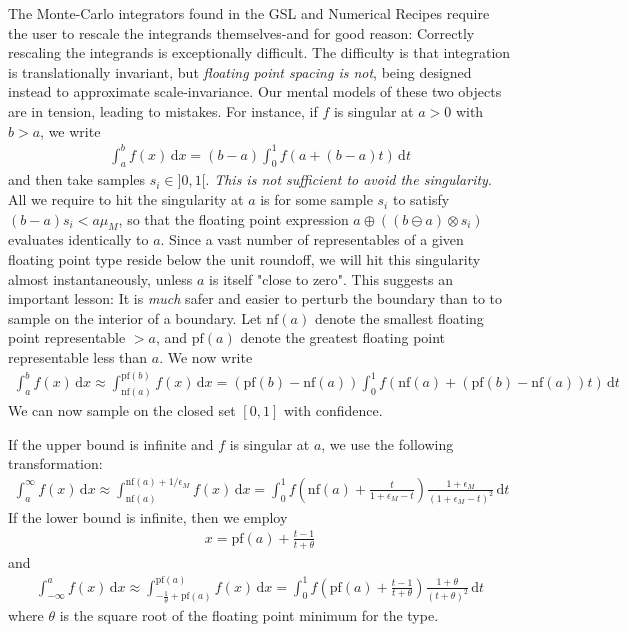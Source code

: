 \documentclass{ansarticle}
\begin{document}
The Monte-Carlo integrators found in the GSL and Numerical Recipes require the user to rescale the integrands themselves-and for good reason: Correctly rescaling the integrands is exceptionally difficult.
The difficulty is that integration is translationally invariant, but \emph{floating point spacing is not}, being designed instead to approximate scale-invariance.
Our mental models of these two objects are in tension, leading to mistakes.
For instance, if $f$ is singular at $a > 0$ with $b > a$, we write
\begin{align*}
\int_{a}^{b} f(x) \, \mathrm{d}x = (b-a) \int_{0}^{1} f(a + (b-a)t) \, \mathrm{d}t
\end{align*}
and then take samples $s_{i} \in ]0, 1[$.
\emph{This is not sufficient to avoid the singularity}.
All we require to hit the singularity at $a$ is for some sample $s_i$ to satisfy $(b-a)s_i < a\mu_{M}$, so that the floating point expression $a\oplus((b\ominus a)\otimes s_i)$ evaluates identically to $a$.
Since a vast number of representables of a given floating point type reside below the unit roundoff, we will hit this singularity almost instantaneously, unless $a$ is itself "close to zero".
This suggests an important lesson: It is \emph{much} safer and easier to perturb the boundary than to to sample on the interior of a boundary.
Let $\mathrm{nf}(a)$ denote the smallest floating point representable $> a$, and $\mathrm{pf}(a)$ denote the greatest floating point representable less than $a$.
We now write
\begin{align*}
\int_{a}^{b} f(x) \, \mathrm{d}x \approx \int_{\mathrm{nf}(a)}^{\mathrm{pf}(b)} f(x) \, \mathrm{d}x  = (\mathrm{pf}(b)- \mathrm{nf}(a)) \int_{0}^{1} f(\mathrm{nf}(a) + (\mathrm{pf}(b)-\mathrm{nf}(a))t) \, \mathrm{d}t
\end{align*}
We can now sample on the closed set $[0, 1]$ with confidence.

If the upper bound is infinite and $f$ is singular at $a$, we use the following transformation:
\begin{align*}
\int_{a}^{\infty} f(x) \, \mathrm{d}x \approx \int_{\mathrm{nf}(a)}^{\mathrm{nf}(a) + 1/\epsilon_{M}} f(x) \, \mathrm{d}x = \int_{0}^{1} f\left(\mathrm{nf}(a) + \frac{t}{1+\epsilon_{M} - t}\right) \frac{1+\epsilon_{M}}{(1+\epsilon_{M} -t)^2} \, \mathrm{d}t
\end{align*}
If the lower bound is infinite, then we employ
\begin{align*}
x = \mathrm{pf}(a) + \frac{t-1}{t+\theta}
\end{align*}
and
\begin{align*}
\int_{-\infty}^{a} f(x) \, \mathrm{d}x
\approx
\int_{-\frac{1}{\theta} + \mathrm{pf}(a)}^{ \mathrm{pf}(a)} f(x) \, \mathrm{d}x
=
\int_{0}^{1} f\left( \mathrm{pf}(a)+ \frac{t-1}{t+\theta}\right) \frac{1+\theta}{(t+\theta)^{2}} \, \mathrm{d}t
\end{align*}
where $\theta$ is the square root of the floating point minimum for the type.
\end{document}
